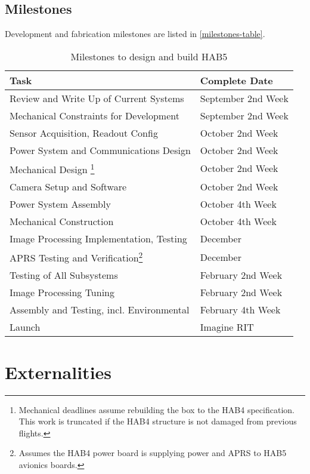 \documentclass[conference]{IEEEtran} %
\begin{document}
\subsection{Milestones}
Development and fabrication milestones are listed in \autoref{milestones-table}.
\begin{table}[!ht]
  \centering
  \caption{Milestones to design and build HAB5}

\begin{minipage}{.45\textwidth}
  \noindent
  \begin{tabular}{@{}ll@{}}

  \label{milestones-table}
    \textbf{Task} & \textbf{Complete Date} \\
    \midrule
    Review and Write Up of Current Systems & September 2nd Week \\
    Mechanical Constraints for Development & September 2nd Week \\ 
    Sensor Acquisition, Readout Config & October 2nd Week \\
    Power System and Communications Design & October 2nd Week \\
    Mechanical Design \footnote{Mechanical deadlines assume rebuilding the box to the HAB4 specification. This work is truncated if the HAB4 structure is not damaged from previous flights.} & October 2nd Week \\
    Camera Setup and Software & October 2nd Week \\
    Power System Assembly & October 4th Week \\
    Mechanical Construction & October 4th Week \\
    Image Processing Implementation, Testing & December \\
    APRS Testing and Verification\footnote{Assumes the HAB4 power board is supplying power and APRS to HAB5 avionics boards.} & December \\
    Testing of All Subsystems & February 2nd Week \\
    Image Processing Tuning & February 2nd Week \\
    Assembly and Testing, incl. Environmental & February 4th Week \\
    Launch & Imagine RIT \\
  \end{tabular}
\end{minipage}
\end{table}

\section{Externalities}
\end{document}
